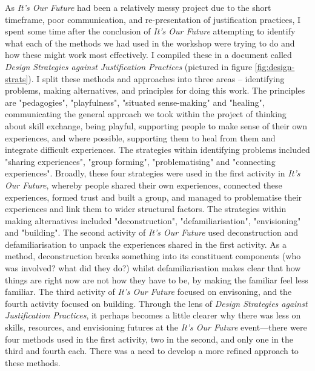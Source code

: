 As \textit{It's Our Future} had been a relatively messy project due to the short timeframe, poor communication, and re-presentation of justification practices, I spent some time after the conclusion of \textit{It's Our Future} attempting to identify what each of the methods we had used in the workshop were trying to do and how these might work most effectively. I compiled these in a document called \textit{Design Strategies against Justification Practices} (pictured in figure \ref{fig:design-strats}). I split these methods and approaches into three areas – identifying problems, making alternatives, and principles for doing this work. The principles are "pedagogies", "playfulness", "situated sense-making" and "healing", communicating the general approach we took within the project of thinking about skill exchange, being playful, supporting people to make sense of their own experiences, and where possible, supporting them to heal from them and integrate difficult experiences. The strategies within identifying problems included "sharing experiences", "group forming", "problematising" and "connecting experiences". Broadly, these four strategies were used in the first activity in \textit{It's Our Future}, whereby people shared their own experiences, connected these experiences, formed trust and built a group, and managed to problematise their experiences and link them to wider structural factors. The strategies within making alternatives included "deconstruction", "defamiliarisation", "envisioning" and "building". The second activity of \textit{It's Our Future} used deconstruction and defamiliarisation to unpack the experiences shared in the first activity. As a method, deconstruction breaks something into its constituent components (who was involved? what did they do?) whilst defamiliarisation makes clear that how things are right now are not how they have to be, by making the familiar feel less familiar. The third activity of \textit{It's Our Future} focused on envisoning, and the fourth activity focused on building. Through the lens of \textit{Design Strategies against Justification Practices}, it perhaps becomes a little clearer why there was less on skills, resources, and envisioning futures at the \textit{It's Our Future} event—there were four methods used in the first activity, two in the second, and only one in the third and fourth each. There was a need to develop a more refined approach to these methods. 


